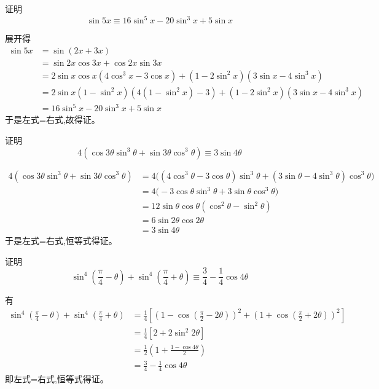 \begin{questions}
    \question 证明 
    \[
    \sin 5x \equiv 16\sin^5 x - 20 \sin^3 x + 5 \sin x
    \]
    \begin{solution}
        展开得
        \begin{align*}
        \sin 5x
        &= \sin(2x+3x) \\
        &= \sin 2x \cos 3x + \cos 2x \sin 3x \\
        &= 2 \sin x \cos x(4\cos^3 x - 3\cos x) + (1-2\sin^2 x)(3\sin x - 4\sin^3 x) \\
        &= 2 \sin x (1-\sin^2 x)\left(4(1-\sin^2 x)-3\right) + (1-2\sin^2 x)(3\sin x - 4\sin^3 x) \\
        &= 16\sin^5 x - 20\sin^3 x + 5\sin x
        \end{align*}
        于是左式=右式,故得证。
    \end{solution}

    \question 证明
    \[
    4 (\cos 3\theta \sin^3 \theta + \sin 3\theta \cos^3 \theta) \equiv 3 \sin 4\theta
    \]
    \begin{solution}
        \begin{align*}
        4 (\cos 3\theta \sin^3 \theta + \sin 3\theta \cos^3 \theta)
        &= 4 \bigl((4\cos^3\theta - 3\cos\theta)\sin^3\theta + (3\sin\theta - 4\sin^3\theta)\cos^3\theta\bigr) \\
        &= 4 \bigl(-3\cos\theta\sin^3\theta + 3\sin\theta\cos^3\theta\bigr) \\
        &= 12 \sin\theta\cos\theta(\cos^2\theta - \sin^2\theta) \\
        &= 6 \sin 2\theta \cos 2\theta \\
        &= 3 \sin 4\theta
        \end{align*}
        于是左式=右式,恒等式得证。
    \end{solution}

    \question 证明
    \[
    \sin^4\left(\frac{\pi}{4}-\theta\right)+\sin^4\left(\frac{\pi}{4}+\theta\right)
    \equiv \frac{3}{4}-\frac{1}{4}\cos 4\theta
    \]
    \begin{solution}
        有
        \begin{align*}
        \sin^4\left(\frac{\pi}{4}-\theta\right)+\sin^4\left(\frac{\pi}{4}+\theta\right)
        &=\frac{1}{4}\left[(1-\cos\left(\frac{\pi}{2}-2\theta\right))^2+(1+\cos\left(\frac{\pi}{2}+2\theta\right))^2\right] \\
        &=\frac{1}{4}\left[2+2\sin^2 2\theta\right] \\
        &=\frac{1}{2}\left(1+\frac{1-\cos 4\theta}{2}\right) \\
        &=\frac{3}{4}-\frac{1}{4}\cos 4\theta
        \end{align*}
        即左式=右式,恒等式得证。
    \end{solution}


\end{questions}
